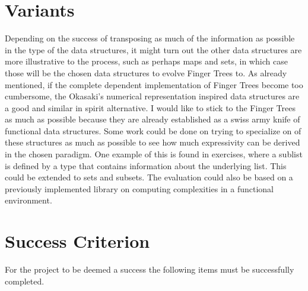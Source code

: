 \documentclass[12pt]{article}
\begin{document}
\section*{Variants}

Depending on the success of transposing as much of the information as possible
in the type of the data structures, it might turn out the other data structures
are more illustrative to the process, such as perhaps maps and sets, in which
case those will be the chosen data structures to evolve Finger Trees to.
As already mentioned, if the complete dependent implementation of Finger Trees
become too cumbersome, the Okasaki's numerical representation inspired
data structures are a good and similar in spirit alternative. I would like to
stick to the Finger Trees as much as possible because they are already established
as a swiss army knife of functional data structures.
Some work could be done on trying to specialize on of these structures as much
as possible to see how much expressivity can be derived in the chosen paradigm.
One example of this is found in \cite{okasaki} exercises, where a sublist is defined by a
type that contains information about the underlying list. This could be extended
to sets and subsets.
The evaluation could also be based on a previously implemented library on computing
complexities in a functional environment. \cite{complexity}

\section*{Success Criterion}

For the project to be deemed a success the following items must be
successfully completed.
\end{document}
